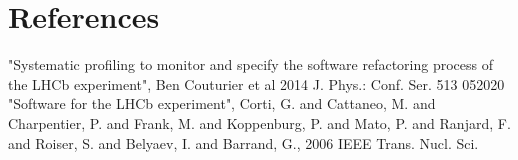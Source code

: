 \documentclass[a4paper]{jpconf}
\begin{document}



\section*{References}
\begin{thebibliography}{9}
 "Systematic profiling to monitor and specify the software refactoring process of the LHCb experiment", Ben
Couturier et al 2014 J. Phys.: Conf. Ser. 513 052020
 "Software for the LHCb experiment", Corti, G. and Cattaneo, M. and Charpentier, P. and Frank,
M. and Koppenburg, P. and Mato, P. and Ranjard, F. and
Roiser, S. and Belyaev, I. and Barrand, G., 2006 IEEE
Trans. Nucl. Sci.
\end{thebibliography}
\end{document}

